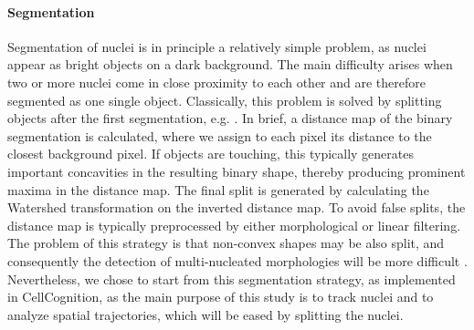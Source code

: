 \paragraph*{Segmentation}
Segmentation of nuclei is in principle a relatively simple problem, as
nuclei appear as bright objects on a dark background. The
main difficulty arises when two or more nuclei come in close proximity
to each other and are therefore segmented as one single object. Classically,
this problem is solved by splitting objects after the first
segmentation, e.g. \cite{cellcognition}. 
In brief, a distance map of the binary segmentation is
calculated, where we assign to each pixel its distance to the closest
background pixel. If objects are touching, this typically generates
important concavities in the resulting binary shape, thereby producing
prominent maxima in the distance map. The final split is generated by
calculating the Watershed transformation on the inverted distance
map. To avoid false splits, the distance map is typically preprocessed
by either morphological or linear filtering. The problem of this
strategy is that non-convex shapes may be also split, and consequently
the detection of multi-nucleated morphologies will be more
difficult \cite{Walter2010}. Nevertheless, we chose to start from this segmentation
strategy, as implemented in CellCognition, as the main purpose of this
study is to track nuclei and to analyze spatial trajectories, which
will be eased by splitting the nuclei. 



